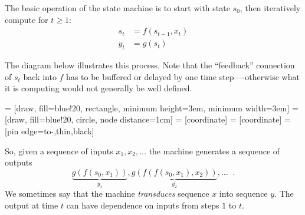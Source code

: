 The basic operation of the state machine is to 
start with state $s_0$, then iteratively compute for $t \geq 1$:
\begin{align}
s_t & = f(s_{t - 1}, x_t) \\
y_t & =  g(s_t) 
\end{align}
\begin{examplebox}
The diagram  below illustrates  this  process.  Note that the
``feedback'' connection of  $s_t$ back into $f$ has to be buffered  or
delayed by one time step----otherwise what it is computing would not
generally be well defined.
\begin{center}
 = [draw, fill=blue!20, rectangle, minimum height=3em, minimum width=3em]
 = [draw, fill=blue!20, circle, node distance=1cm]
 = [coordinate]
 = [coordinate]
 = [pin edge={to-,thin,black}]

\end{center}
\end{examplebox}
So, given a sequence of inputs $x_1, x_2, \dots$ the machine generates a
sequence of outputs  
$$ \underbrace{g(f(s_0, x_1))}_{y_1}, \underbrace{g(f(f(s_0, x_1), x_2
))}_{y_2}, \dots \;\;.$$ 
We sometimes say that the machine {\em  transduces} sequence  $x$ into
sequence $y$.
The output at time $t$ can have dependence on inputs from steps $1$ to
$t$. 


